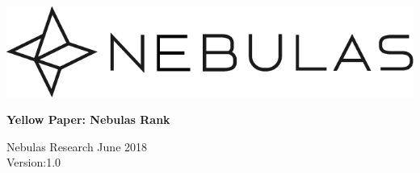 \documentclass[12pt]{article}
\begin{document}
\pagestyle{empty}

\pagecolor{yellow!30}

\begin{titlepage}
  \begin{center}
    \vspace*{5.5cm}
    \includegraphics[scale=0.5]{../common/Nebulas.png}
    \vspace{0.5cm}


    \textbf{\huge{Yellow Paper: Nebulas Rank}}

    \vspace{0.5cm}
    Nebulas Research
    \vfill
    June 2018\\
    Version:1.0
    \textbf{}
  \end{center}

\end{titlepage}
\setcounter{page}{0}
\tableofcontents
\newpage
\setcounter{page}{1}
\pagestyle{fancy}
\vspace*{0.01cm}








\newpage


\newpage
\begin{appendices}


\end{appendices}
\end{document}

